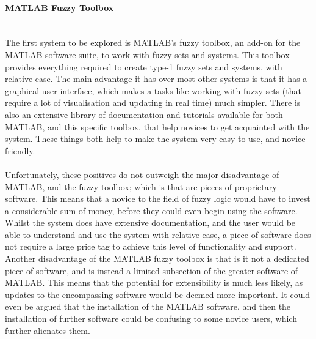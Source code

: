 \paragraph{MATLAB Fuzzy Toolbox}\ \\
The first system to be explored is MATLAB's fuzzy toolbox, an add-on for the MATLAB software suite, to work with fuzzy sets and systems. This toolbox provides everything required to create type-1 fuzzy sets and systems, with relative ease. The main advantage it has over most other systems is that it has a graphical user interface, which makes a tasks like working with fuzzy sets (that require a lot of visualisation and updating in real time) much simpler. There is also an extensive library of documentation and tutorials available for both MATLAB, and this specific toolbox, that help novices to get acquainted with the system. These things both help to make the system very easy to use, and novice friendly.\ \\
\ \\
Unfortunately, these positives do not outweigh the major disadvantage of MATLAB, and the fuzzy toolbox; which is that are pieces of proprietary software. This means that a novice to the field of fuzzy logic would have to invest a considerable sum of money, before they could even begin using the software. Whilst the system does have extensive documentation, and the user would be able to understand and use the system with relative ease, a piece of software does not require a large price tag to achieve this level of functionality and support. Another disadvantage of the MATLAB fuzzy toolbox is that is it not a dedicated piece of software, and is instead a limited subsection of the greater software of MATLAB. This means that the potential for extensibility is much less likely, as updates to the encompassing software would be deemed more important. It could even be argued that the installation of the MATLAB software, and then the installation of further software could be confusing to some novice users, which further alienates them.

